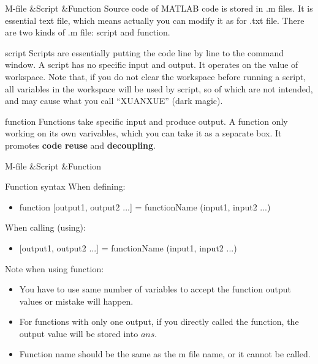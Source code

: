 \begin{frame}{M-file \&Script \&Function}
Source code of MATLAB code is stored in .m files. It is essential text file, which means actually you can modify it as for .txt file. There are two kinds of .m file: script and function.
\begin{block}{script}
Scripts are essentially putting the code line by line to the command window. A script has no specific input and output. It operates on the value of workspace. Note that, if you do not clear the workspace before running a script, all variables in the workspace will be used by script, so of which are not intended, and may cause what you call ``XUANXUE'' (dark magic). \footnotemark
\end{block}
\begin{block}{function}
Functions take specific input and produce output. A function only working on its own varivables, which you can take it as a separate box. It promotes \textbf{code reuse} and \textbf{decoupling}.
\end{block}
\end{frame}

\begin{frame}{M-file \&Script \&Function}
\begin{block}{Function syntax}
When defining:
\begin{itemize}
\item function [output1, output2 ...] = functionName (input1, input2 ...)
\end{itemize}
When calling (using):
\begin{itemize}
\item $[$output1, output2 ...$]$ = functionName (input1, input2 ...)
\end{itemize}
\end{block}
Note when using function:
\begin{itemize}
\item You have to use same number of variables to accept the function output values or mistake will happen.
\item For functions with only one output, if you directly called the function, the output value will be stored into $ans$.
\item Function name should be the same as the m file name, or it cannot be called.
\end{itemize}
\end{frame}


